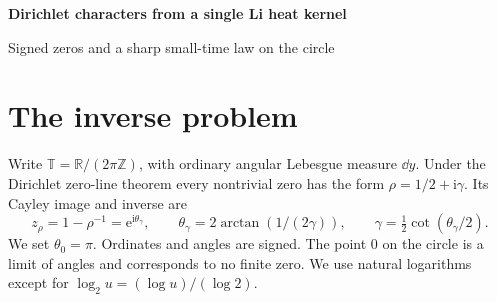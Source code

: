 \documentclass[11pt,letterpaper]{article}
\newcommand{\R}{\mathbb R}\newcommand{\T}{\mathbb T}\newcommand{\Z}{\mathbb Z}
\newcommand{\I}{\mathrm i}\newcommand{\e}{\mathrm e}
\theoremstyle{plain}
\theoremstyle{definition}\newtheorem{example}[theorem]{Example}
\begin{document}
\thispagestyle{empty}
\vspace{8mm}
\begin{center}
{\LARGE\bfseries Dirichlet characters from a single Li heat kernel\par}
\vspace{3mm}
{\large Signed zeros and a sharp small-time law on the circle\par}
\end{center}
\vspace{3mm}
\begin{abstract}\noindent
For a primitive Dirichlet character $\chi$, exponentiating its full complex Li coefficients gives a positive convolution semigroup on the circle. One exact density at one unknown positive time determines $\chi$, even with an unknown angular origin. Magnitudes of its Fourier coefficients determine the character up to conjugation. Both assertions persist under relative agreement of the Fourier tails outside a set of density zero. At short times the height of the density at an individual zero angle, relative to its height at the origin, reads off the signed zero's multiplicity. At a shortest sum of $k$ angles the corresponding coefficient is the number of ordered representations divided by $k!$. At almost every other point the log of the reciprocal relative height is asymptotic to $L\log L/\log 2$, where $L=\log(1/t)$. The same constant governs the minimum over the circle. For products of Cayley factors, angular precision $10^{-D}$ costs asymptotically $\log_2 D$ zero factors for almost every target, with a matching worst-case count. An interval computation for a conjugate pair modulo five certifies thirteen successive asymmetric examples. The arithmetic input is the formal zero-line theorem for Dirichlet $L$-functions.
\end{abstract}

\section{The inverse problem}
Write $\T=\R/(2\pi\Z)$, with ordinary angular Lebesgue measure $\dd y$. Under the Dirichlet zero-line theorem every nontrivial zero has the form $\rho=1/2+\I\gamma$. Its Cayley image and inverse are
\begin{equation}\label{cayley}
 z_\rho=1-\rho^{-1}=\e^{\I\theta_\gamma},\qquad
 \theta_\gamma=2\arctan(1/(2\gamma)),\qquad
 \gamma=\tfrac12\cot(\theta_\gamma/2).
\end{equation}
We set $\theta_0=\pi$. Ordinates and angles are signed. The point $0$ on the circle is a limit of angles and corresponds to no finite zero. We use natural logarithms except for $\log_2 u=(\log u)/(\log 2)$.
\end{document}
